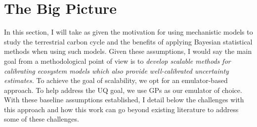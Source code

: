 \documentclass[12pt]{article}
\begin{document}
\section{The Big Picture}
In this section, I will take as given the motivation for using mechanistic models to study the terrestrial carbon cycle and the benefits of applying Bayesian statistical methods when using such models. 
Given these assumptions, I would say the main goal from a methodological point of view is to \textit{develop scalable methods for calibrating ecosystem models which also provide well-calibrated
uncertainty estimates.} To achieve the goal of scalability, we opt for an emulator-based approach. To help address the UQ goal, we use GPs as our emulator of choice. With these baseline assumptions 
established, I detail below the challenges with this approach and how this work can go beyond existing literature to address some of these challenges. 
\end{document}
